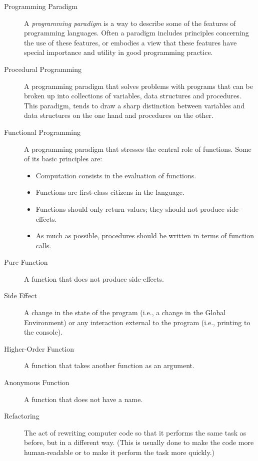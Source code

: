 \documentclass[]{book}
\providecommand{\tightlist}{%
  \setlength{\itemsep}{0pt}\setlength{\parskip}{0pt}}
\theoremstyle{definition}
\theoremstyle{definition}
\theoremstyle{remark}
\begin{document}
{\begin{description}
\item[Programming Paradigm ]
A \emph{programming paradigm} is a way to describe some of the features
of programming languages. Often a paradigm includes principles
concerning the use of these features, or embodies a view that these
features have special importance and utility in good programming
practice.
\item[Procedural Programming ]
A programming paradigm that solves problems with programs that can be
broken up into collections of variables, data structures and procedures.
This paradigm, tends to draw a sharp distinction between variables and
data structures on the one hand and procedures on the other.
\item[Functional Programming ]
A programming paradigm that stresses the central role of functions. Some
of its basic principles are:

\begin{itemize}
\tightlist
\item
  Computation consists in the evaluation of functions.
\item
  Functions are first-class citizens in the language.
\item
  Functions should only return values; they should not produce
  side-effects.
\item
  As much as possible, procedures should be written in terms of function
  calls.
\end{itemize}
\item[Pure Function ]
A function that does not produce side-effects.
\item[Side Effect ]
A change in the state of the program (i.e., a change in the Global
Environment) or any interaction external to the program (i.e., printing
to the console).
\item[Higher-Order Function ]
A function that takes another function as an argument.
\item[Anonymous Function ]
A function that does not have a name.
\item[Refactoring ]
The act of rewriting computer code so that it performs the same task as
before, but in a different way. (This is usually done to make the code
more human-readable or to make it perform the task more quickly.)
\end{description}

}
\end{document}
